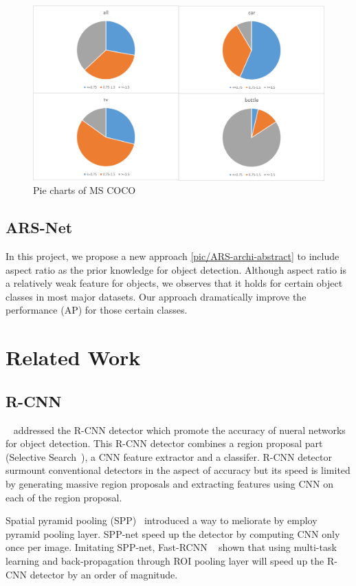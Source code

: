 \documentclass[10pt,twocolumn,letterpaper]{article}
\begin{document}
\begin{figure}[h]
\centering
\includegraphics[width=0.7\linewidth]{pic/dist_pics/pies_coco}
\caption{Pie charts of MS COCO}
\label{fig:piescoco}
\end{figure}

\subsection{ARS-Net}
\par
In this project, we propose a new approach \ref{pic/ARS-archi-abstract} to include aspect ratio as the prior knowledge for object detection. Although aspect ratio is a relatively weak feature for objects, we observes that it holds for certain object classes in most major datasets. Our approach dramatically improve the performance (AP) for those certain classes.

\section{Related Work}
	\label{sec:related-work}

\subsection{R-CNN}
~\cite{RCNN} addressed the R-CNN detector which promote the accuracy of nueral networks for object detection. This R-CNN detector combines a region proposal part (Selective Search~\cite{SelectiveSearch}), a CNN feature extractor and a classifer. R-CNN detector surmount conventional detectors in the aspect of accuracy but its speed is limited by generating massive region proposals and extracting features using CNN on each of the region proposal. 

Spatial pyramid pooling (SPP)~\cite{SPP} introduced a way to meliorate by employ pyramid pooling layer. SPP-net speed up the detector by computing CNN only once per image. Imitating SPP-net, Fast-RCNN ~\cite{fastRCNN} shown that using multi-task learning and back-propagation through ROI pooling layer will speed up the R-CNN detector by an order of magnitude. 
\end{document}
